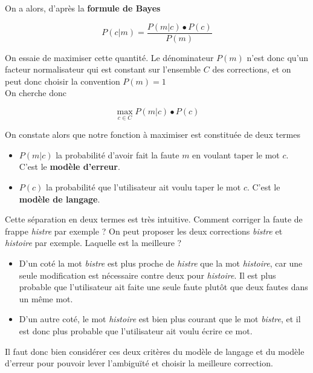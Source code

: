 \documentclass[10pt,a4paper]{article}
\begin{document}
On a alors, d'après la \textbf{formule de Bayes}

\begin{equation}
P(c|m) = \frac{P(m|c) \bullet P(c)}{P(m)}
\end{equation}

On essaie de maximiser cette quantité. Le dénominateur $P(m)$ n'est donc qu'un facteur normalisateur qui est constant sur l'ensemble $C$ des corrections, et on peut donc choisir la convention $P(m) = 1$\\

On cherche donc 

\begin{equation}
\max\limits_{c \in C} P(m|c) \bullet P(c)
\end{equation}

On constate alors que notre fonction à maximiser est constituée de deux termes\\

\begin{itemize}
\item $P(m|c)$ la probabilité d'avoir fait la faute $m$ en voulant taper le mot $c$. C'est le \textbf{modèle d'erreur}.
\item $P(c)$ la probabilité que l'utilisateur ait voulu taper le mot $c$. C'est le \textbf{modèle de langage}.
\end{itemize}

Cette séparation en deux termes est très intuitive. Comment corriger la faute de frappe \textit{histre} par exemple ? On peut proposer les deux corrections \textit{bistre} et \textit{histoire} par exemple. Laquelle est la meilleure ?\\

\begin{itemize}
\item D'un coté la mot \textit{bistre} est plus proche de \textit{histre} que la mot \textit{histoire}, car une seule modification est nécessaire contre deux pour \textit{histoire}. Il est plus probable que l'utilisateur ait faite une seule faute plutôt que deux fautes dans un même mot.
\item D'un autre coté, le mot \textit{histoire} est bien plus courant que le mot \textit{bistre}, et il est donc plus probable que l'utilisateur ait voulu écrire ce mot.
\end{itemize}

Il faut donc bien considérer ces deux critères du modèle de langage et du modèle d'erreur pour pouvoir lever l'ambiguïté et choisir la meilleure correction.
\end{document}
